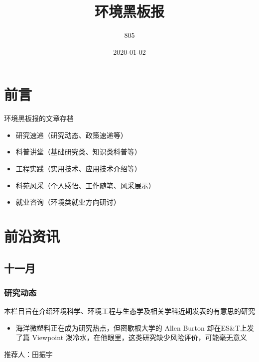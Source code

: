 \documentclass[]{book}
\title{环境黑板报}
\author{805}
\date{2020-01-02}
\providecommand{\tightlist}{%
  \setlength{\itemsep}{0pt}\setlength{\parskip}{0pt}}
\begin{document}
\maketitle

{
\setcounter{tocdepth}{1}
\tableofcontents
}
\hypertarget{ux524dux8a00}{%
\chapter{前言}\label{ux524dux8a00}}

环境黑板报的文章存档

\begin{itemize}
\item
  研究速递（研究动态、政策速递等）
\item
  科普讲堂（基础研究类、知识类科普等）
\item
  工程实践（实用技术、应用技术介绍等）
\item
  科苑风采（个人感悟、工作随笔、风采展示）
\item
  就业咨询（环境类就业方向研讨）
\end{itemize}

\hypertarget{ux524dux6cbfux8d44ux8baf}{%
\chapter{前沿资讯}\label{ux524dux6cbfux8d44ux8baf}}

\hypertarget{ux5341ux4e00ux6708}{%
\section*{十一月}\label{ux5341ux4e00ux6708}}

\hypertarget{ux7814ux7a76ux52a8ux6001}{%
\subsection*{研究动态}\label{ux7814ux7a76ux52a8ux6001}}

本栏目旨在介绍环境科学、环境工程与生态学及相关学科近期发表的有意思的研究

\begin{itemize}
\tightlist
\item
  海洋微塑料正在成为研究热点，但密歇根大学的 Allen Burton 却在ES\&T上发了篇 Viewpoint 泼冷水，在他眼里，这类研究缺少风险评价，可能毫无意义
\end{itemize}

推荐人：田振宇
\end{document}
